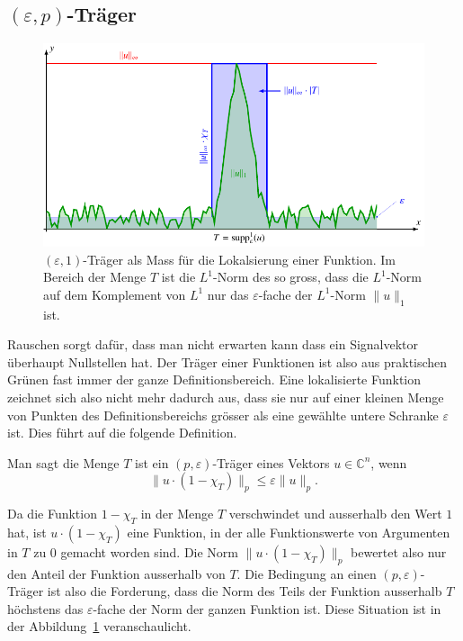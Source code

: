 \subsection{$(\varepsilon,p)$-Träger}
\begin{figure}
\centering
\includegraphics{chapters/060-diskret/images/etraeger.pdf}
\caption{$(\varepsilon,1)$-Träger als Mass für die Lokalsierung
einer Funktion.
Im Bereich der Menge $T$ ist die $L^1$-Norm des so gross, dass
die $L^1$-Norm auf dem Komplement von $L^1$ nur das $\varepsilon$-fache
der $L^1$-Norm $\|u\|_1$ ist.
\label{buch:diskret:unschaerfe:fig:etraeger}}
\end{figure}%
Rauschen sorgt dafür, dass man nicht erwarten kann dass ein
Signalvektor überhaupt Nullstellen hat.
Der Träger einer Funktionen ist also aus praktischen Grünen fast immer
der ganze Definitionsbereich.
Eine lokalisierte Funktion zeichnet sich also nicht mehr dadurch aus,
dass sie nur auf einer kleinen Menge von Punkten des Definitionsbereichs
grösser als eine gewählte untere Schranke $\varepsilon$ ist.
Dies führt auf die folgende Definition.

\begin{definition}
Man sagt die Menge $T$ ist ein $(p,\varepsilon)$-Träger eines Vektors
$u\in\mathbb{C}^n$, wenn 
\[
\| u\cdot (1-\chi_T)  \|_p \le \varepsilon \|u\|_p.
\]
\end{definition}

Da die Funktion $1-\chi_T$ in der Menge $T$ verschwindet und ausserhalb
den Wert $1$ hat, ist
$u\cdot (1-\chi_T)$ eine Funktion, in der alle Funktionswerte von
Argumenten in $T$ zu $0$ gemacht worden sind.
Die Norm $\| u\cdot (1-\chi_T) \|_p$ bewertet also nur den Anteil der
Funktion ausserhalb von $T$.
Die Bedingung an einen $(p,\varepsilon)$-Träger ist also die Forderung,
dass die Norm des Teils der Funktion ausserhalb $T$ höchstens das
$\varepsilon$-fache der Norm der ganzen Funktion ist.
Diese Situation ist in der Abbildung~\ref{buch:diskret:unschaerfe:fig:etraeger}
veranschaulicht.

